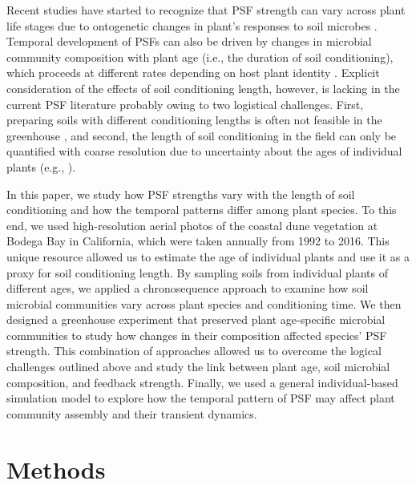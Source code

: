 Recent studies have started to recognize that PSF strength can vary across plant life stages due to ontogenetic changes in plant's responses to soil microbes \citep{Hawkes2012, Dudenhoffer2017, Bezemer2018}. 
Temporal development of PSFs can also be driven by changes in microbial community composition with plant age (i.e., the duration of soil conditioning), which proceeds at different rates depending on host plant identity \citep{Knelman2012}. 
Explicit consideration of the effects of soil conditioning length, however, is lacking in the current PSF literature probably owing to two logistical challenges. First, preparing soils with different conditioning lengths is often not feasible in the greenhouse \citep{Kardol2013, Kulmatiski2018}, and second, the length of soil conditioning in the field can only be quantified with coarse resolution due to uncertainty about the ages of individual plants (e.g., \citealp{Speek2015, Day2015}).
\par


In this paper, we study how PSF strengths vary with the length of soil conditioning and how the temporal patterns differ among plant species. 
To this end, we used high-resolution aerial photos of the coastal dune vegetation at Bodega Bay in California, which were taken annually from 1992 to 2016. This unique resource allowed us to estimate the age of individual plants and use it as a proxy for soil conditioning length. 
By sampling soils from individual plants of different ages, we applied a chronosequence approach to examine how soil microbial communities vary across plant species and conditioning time. We then designed a greenhouse experiment that preserved plant age-specific microbial communities to study how changes in their composition affected species' PSF strength.
This combination of approaches allowed us to overcome the logical challenges outlined above and study the link between plant age, soil microbial composition, and feedback strength. 
Finally, we used a general individual-based simulation model to explore how the temporal pattern of PSF may affect plant community assembly and their transient dynamics.
\par



\section{Methods}
